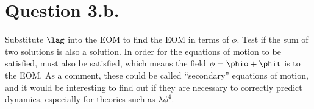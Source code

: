 \documentclass{article}
\begin{document}
\section{Question 3.b.}
Substitute $\lag$ into the EOM to find the EOM in terms of $\phi$.
Test if the sum of two solutions is also a solution.
\e{\phi=\phio+\phit}
In order for the equations of motion  to be satisfied,  must also be satisfied, which means the field $\phi=\phio+\phit$ is  to the EOM. As a comment, these could be called ``secondary'' equations of motion, and it would be interesting to find out if they are necessary to correctly predict dynamics, especially for theories such as $\lambda \phi^4$.
\end{document}

